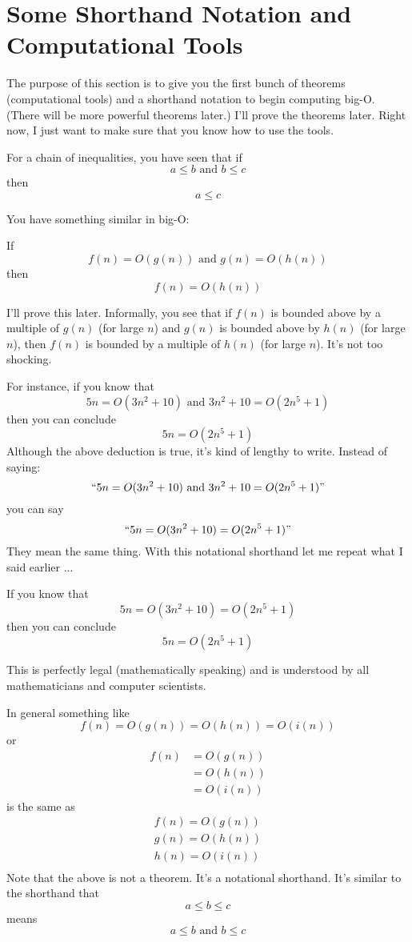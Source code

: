 \section{Some Shorthand Notation and Computational Tools}

The purpose of this section is to give you 
the first bunch of theorems (computational
tools) and a shorthand notation to begin computing big-O.
(There will be more powerful theorems later.)
I'll prove the theorems later. 
Right now, I just want to make sure that you know how to use the tools.

For a chain of inequalities, you have seen that if
\[
a \leq b \text{ and } b \leq c
\] 
then 
\[
a \leq c
\]

You have something similar in big-O:

\begin{thm}
If 
\[
f(n) = O(g(n)) \text{ and } g(n) = O(h(n))
\]
then
\[
f(n) = O(h(n))
\]
\end{thm}

I'll prove this later. 
Informally, you see that if $f(n)$ is bounded above
by a multiple of $g(n)$ (for large $n$) and 
$g(n)$ is bounded above by $h(n)$ (for large $n$),
then $f(n)$ is bounded by a multiple of $h(n)$ (for large $n$).
It's not too shocking.

For instance, if you know that
\[
5n = O(3n^2 + 10) \text{ and }
3n^2 + 10 = O(2n^5 + 1)
\]
then you can conclude
\[
5n = O(2n^5 + 1)
\]
Although the above deduction is true, it's kind of lengthy to write.
Instead of saying:
\[
\text{\lq\lq}
5n = O(3n^2 + 10) \text{ and } 3n^2 + 10 = O(2n^5 + 1)
\text{''}
\]
you can say
\[
\text{\lq\lq}
5n = O(3n^2 + 10) = O(2n^5 + 1)
\text{''}
\]
They mean the same thing.
With this notational shorthand let me repeat what I said earlier ...

If you know that
\[
5n = O(3n^2 + 10) = O(2n^5 + 1)
\]
then you can conclude
\[
5n = O(2n^5 + 1)
\]

This is perfectly legal (mathematically speaking) and is understood
by all mathematicians and computer scientists.

In general something like
\[
f(n) = O(g(n)) = O(h(n)) = O(i(n))
\]
or 
\begin{align*}
f(n) 
&= O(g(n)) \\ 
&= O(h(n)) \\
&= O(i(n))
\end{align*}
is the same as
\begin{align*}
f(n) = O(g(n)) \\
g(n) = O(h(n)) \\
h(n) = O(i(n)) \\
\end{align*}
Note that the above is not a theorem.
It's a notational shorthand.
It's similar to the shorthand that
\[
a \leq b \leq c
\]
means
\[
a \leq b \text{ and } b \leq c
\]

